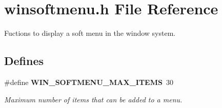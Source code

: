 \section{winsoftmenu.h File Reference}
\label{winsoftmenu_8h}
Fuctions to display a soft menu in the window system. 

\subsection*{Defines}
\begin{CompactItemize}
\item 
\#define {\bf WIN\_\-SOFTMENU\_\-MAX\_\-ITEMS}~30
\begin{CompactList}\small\item\em Maximum number of items that can be added to a menu. \item\end{CompactList}\end{CompactItemize}
